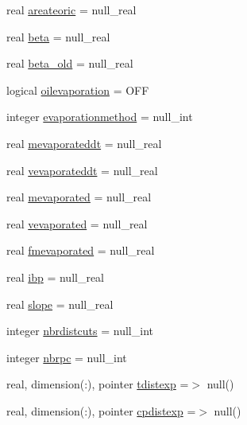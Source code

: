 \begin{DoxyCompactItemize}
\item 
real \mbox{\hyperlink{structmoduleoil__0d_1_1t__var_a8d33ede936f0e18f9f687b9bc36b8657}{areateoric}} = null\+\_\+real
\item 
real \mbox{\hyperlink{structmoduleoil__0d_1_1t__var_a0a9c7cb66d24879a3594ff565c9ed46c}{beta}} = null\+\_\+real
\item 
real \mbox{\hyperlink{structmoduleoil__0d_1_1t__var_aea003e49f14a21fa750bd94e51488592}{beta\+\_\+old}} = null\+\_\+real
\item 
logical \mbox{\hyperlink{structmoduleoil__0d_1_1t__var_a94a52692761a8ec1259ed311bccbf210}{oilevaporation}} = O\+FF
\item 
integer \mbox{\hyperlink{structmoduleoil__0d_1_1t__var_ab44f3828ed905bbf6c30a21852c80c92}{evaporationmethod}} = null\+\_\+int
\item 
real \mbox{\hyperlink{structmoduleoil__0d_1_1t__var_a496e0e847ce77f72176492dee1de5105}{mevaporateddt}} = null\+\_\+real
\item 
real \mbox{\hyperlink{structmoduleoil__0d_1_1t__var_a0397d8f20cb25cd93a79dac4f2e53eaa}{vevaporateddt}} = null\+\_\+real
\item 
real \mbox{\hyperlink{structmoduleoil__0d_1_1t__var_a99c92f9c515f6af1a5bcd480464fc9e0}{mevaporated}} = null\+\_\+real
\item 
real \mbox{\hyperlink{structmoduleoil__0d_1_1t__var_a9745d40750f730d234fe43a917421aaf}{vevaporated}} = null\+\_\+real
\item 
real \mbox{\hyperlink{structmoduleoil__0d_1_1t__var_a2a3ea2097f3a75b63bdf5824795395c4}{fmevaporated}} = null\+\_\+real
\item 
real \mbox{\hyperlink{structmoduleoil__0d_1_1t__var_a0b3bed9b3d4baeb4528481093c25bd2b}{ibp}} = null\+\_\+real
\item 
real \mbox{\hyperlink{structmoduleoil__0d_1_1t__var_a457e228ae827692ad28ea6e7406582b3}{slope}} = null\+\_\+real
\item 
integer \mbox{\hyperlink{structmoduleoil__0d_1_1t__var_a08cc8fc5a91c1f69a538a6918fe3b05d}{nbrdistcuts}} = null\+\_\+int
\item 
integer \mbox{\hyperlink{structmoduleoil__0d_1_1t__var_a38b26f9a3d7452c6f230ef06931b8a61}{nbrpc}} = null\+\_\+int
\item 
real, dimension(\+:), pointer \mbox{\hyperlink{structmoduleoil__0d_1_1t__var_a305925a0e62509e9514b3bf00de40109}{tdistexp}} =$>$ null()
\item 
real, dimension(\+:), pointer \mbox{\hyperlink{structmoduleoil__0d_1_1t__var_abf2632e6a8bfbaf978a91912744efa3a}{cpdistexp}} =$>$ null()

\end{DoxyCompactItemize}
